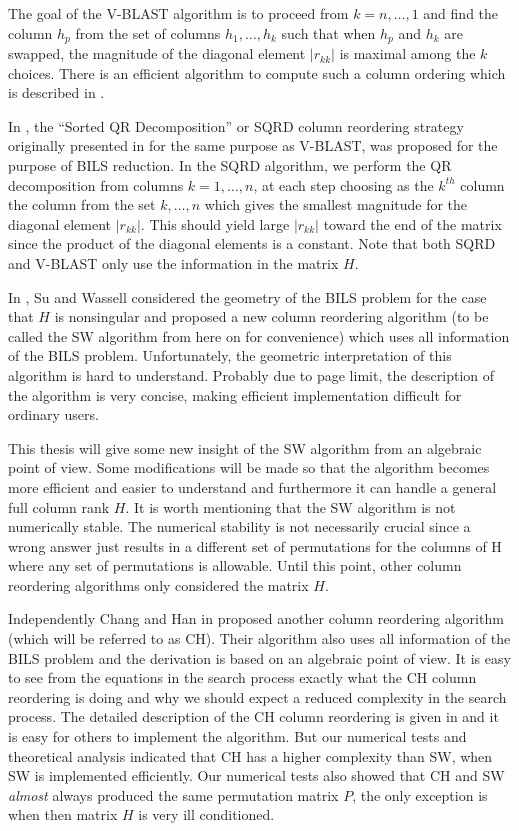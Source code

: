 \documentclass[12pt,Bold,letterpaper]{mcgilletdclass}
\begin{document}
The goal of the V-BLAST algorithm is to proceed from $k=n, \dots,1$ and find the column $h_p$ from the set of columns $h_1, \dots, h_k$ such that when $h_p$ and $h_k$ are swapped, the magnitude of the diagonal element $|r_{kk}|$ is maximal among the $k$ choices. There is an efficient algorithm to compute such a column ordering which is described in \cite{ChaP07}.

In \cite{ChaH05}, the ``Sorted QR Decomposition'' or SQRD column reordering strategy originally presented in \cite{WubBRKK01} for the same purpose as V-BLAST, was proposed for the purpose of BILS reduction. In the SQRD algorithm, we perform the QR decomposition from columns $k = 1,\dots, n$, at each step choosing as the $k^{th}$ column the column from the set $k,\dots,n$ which gives the smallest magnitude for the diagonal element $|r_{kk}|$. This should yield large $|r_{kk}|$ toward the end of the matrix since the product of the diagonal elements is a constant. Note that both SQRD and V-BLAST only use the information in the matrix $H$.

In \cite{SuW05}, Su and Wassell considered the geometry of the BILS
problem for the case that $H$ is nonsingular and proposed a new column reordering algorithm (to be called
the SW algorithm from here on for convenience) which uses all information of the BILS problem.
Unfortunately, the geometric interpretation of this algorithm is hard to understand.
Probably due to page limit, the description of the algorithm is very concise, 
making efficient implementation difficult for ordinary users.

This thesis will give some new insight of the SW algorithm from an algebraic point of view.
Some modifications will be made so that the algorithm becomes more efficient
and easier to understand and furthermore it can handle a general full column rank $H$.
It is worth mentioning that the SW algorithm is not numerically stable. The numerical stability is not
necessarily crucial since a wrong answer just results in a different set of
permutations for the columns of H where any set of permutations is allowable.
Until this point, other column reordering algorithms only considered the matrix $H$.

Independently  Chang and Han in \cite{ChaH05} proposed
another column reordering algorithm (which will be referred to as  CH).
Their algorithm also uses all information of the BILS problem and the derivation
is based on an algebraic point of view. It is  easy to see from the equations in
the search process exactly what the CH column reordering is doing and why we
should expect a reduced complexity in the search process. The detailed
description of the CH column reordering is given in \cite{ChaH05} and it is easy
for others to implement the algorithm.
But our numerical tests and theoretical analysis indicated that CH has a higher complexity than SW, when SW
is implemented efficiently.
Our numerical tests also showed that CH and SW {\em almost} always   
produced the same permutation matrix $P$, the only exception is when then matrix $H$ is very ill conditioned.
\end{document}
